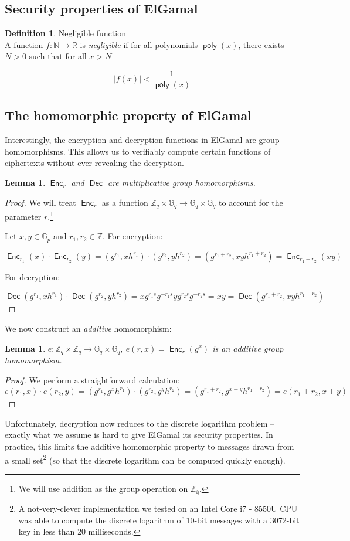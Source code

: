 \documentclass[11pt,twoside,a4paper]{article}
\DeclareMathOperator{\poly}{\mathsf{poly}}
\DeclareMathOperator{\Enc}{\mathsf{Enc}}
\DeclareMathOperator{\Dec}{\mathsf{Dec}}
\newtheorem{lemma}[theorem]{Lemma}
\theoremstyle{definition}
\newtheorem{definition}{Definition}[section]
\begin{document}
\subsection{Security properties of ElGamal}
\begin{definition}{Negligible function}\\
    A function \(f:\mathbb{N}\rightarrow\mathbb{R}\) is \textit{negligible} if for all polynomials \(\poly(x)\), there exists \(N>0\) such that for all \(x>N\)

    \[|f(x)|<\frac{1}{\poly(x)}\]

\end{definition}
\subsection{The homomorphic property of ElGamal}
Interestingly, the encryption and decryption functions in ElGamal are group homomorphisms. This allows us to verifiably compute certain functions of ciphertexts without ever revealing the decryption.
\begin{lemma}\label{lem-mul-homom}
    \(\Enc_r\) and \(\Dec\) are multiplicative group homomorphisms.
\end{lemma}
\begin{proof}
    We will treat \(\Enc_r\) as a function \(\mathbb{Z}_q\times\mathbb{G}_q\rightarrow\mathbb{G}_q\times\mathbb{G}_q\) to account for the parameter \(r\).\footnote{We will use addition as the group operation on \(\mathbb{Z_q}\).}

    Let \(x,y\in\mathbb{G}_p\) and \(r_1,r_2\in\mathbb{Z}\). For encryption:
    
    \[\Enc_{r_1}(x)\cdot\Enc_{r_2}(y)=(g^{r_1},xh^{r_1})\cdot(g^{r_2},yh^{r_2})=(g^{r_1+r_2},xyh^{r_1+r_2})=\Enc_{r_1+r_2}(xy)\]

    For decryption:

    \[\Dec(g^{r_1},xh^{r_1})\cdot\Dec(g^{r_2},yh^{r_2})=xg^{r_1s}g^{-r_1s}yg^{r_2s}g^{-r_2s}=xy=\Dec(g^{r_1+r_2},xyh^{r_1+r_2})\]
\end{proof}

We now construct an \textit{additive} homomorphism:
\begin{lemma}
    \(e:\mathbb{Z}_q\times\mathbb{Z}_q\rightarrow\mathbb{G}_q\times\mathbb{G}_q,\ e(r, x)=\Enc_r(g^x)\) is an additive group homomorphism.
\end{lemma}
\begin{proof}
    We perform a straightforward calculation:
    \[e(r_1, x)\cdot e(r_2,y)=(g^{r_1},g^xh^{r_1})\cdot(g^{r_2},g^yh^{r_2})=(g^{r_1+r_2},g^{x+y}h^{r_1+r_2})=e(r_1+r_2, x+y)\]
\end{proof}
Unfortunately, decryption now reduces to the discrete logarithm problem -- exactly what we assume is hard to give ElGamal its security properties. In practice, this limits the additive homomorphic property to messages drawn from a small set\footnote{A not-very-clever implementation we tested on an Intel Core i7 - 8550U CPU was able to compute the discrete logarithm of 10-bit messages with a 3072-bit key in less than 20 milliseconds.} (so that the discrete logarithm can be computed quickly enough).
\end{document}
